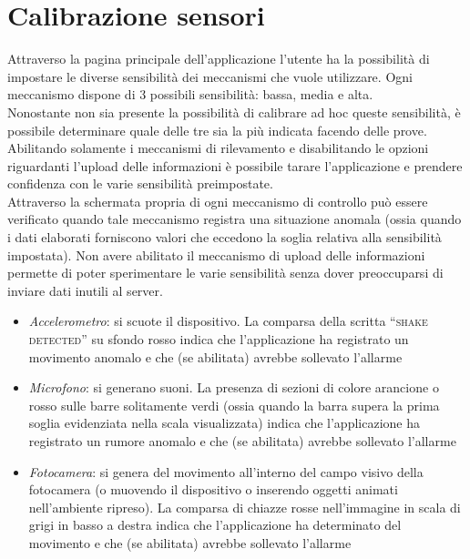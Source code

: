 \section{Calibrazione sensori}
Attraverso la pagina principale dell'applicazione l'utente ha la possibilità di impostare le diverse sensibilità dei meccanismi che vuole utilizzare. Ogni meccanismo dispone di 3 possibili sensibilità: bassa, media e alta.\\
Nonostante non sia presente la possibilità di calibrare ad hoc queste sensibilità, è possibile determinare quale delle tre sia la più indicata facendo delle prove. Abilitando solamente i meccanismi di rilevamento e disabilitando le opzioni riguardanti l'upload delle informazioni è possibile tarare l'applicazione e prendere confidenza con le varie sensibilità preimpostate.\\
Attraverso la schermata propria di ogni meccanismo di controllo può essere verificato quando tale meccanismo registra una situazione anomala (ossia quando i dati elaborati forniscono valori che eccedono la soglia relativa alla sensibilità impostata). Non avere abilitato il meccanismo di upload delle informazioni permette di poter sperimentare le varie sensibilità senza dover preoccuparsi di inviare dati inutili al server.\\
\begin{itemize}
  \item \textit{Accelerometro}: si scuote il dispositivo. La comparsa della scritta ``\textsc{shake detected}'' su sfondo rosso indica che l'applicazione ha registrato un movimento anomalo e che (se abilitata) avrebbe sollevato l'allarme
  \item \textit{Microfono}: si generano suoni. La presenza di sezioni di colore arancione o rosso sulle barre solitamente verdi (ossia quando la barra supera la prima soglia evidenziata nella scala visualizzata) indica che l'applicazione ha registrato un rumore anomalo e che (se abilitata) avrebbe sollevato l'allarme
  \item \textit{Fotocamera}: si genera del movimento all'interno del campo visivo della fotocamera (o muovendo il dispositivo o inserendo oggetti animati nell'ambiente ripreso). La comparsa di chiazze rosse nell'immagine in scala di grigi in basso a destra indica che l'applicazione ha determinato del movimento e che (se abilitata) avrebbe sollevato l'allarme
\end{itemize}


\newpage
